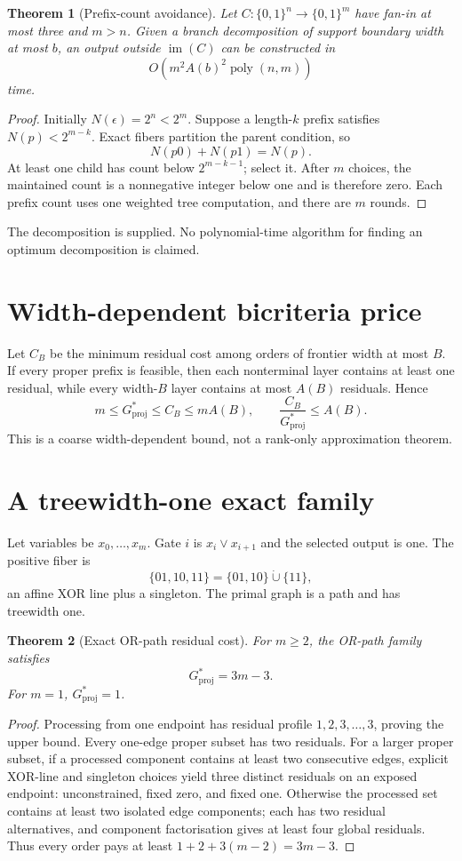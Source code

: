 \documentclass[11pt]{article}
\newtheorem{theorem}{Theorem}[section]
\newcommand{\Gproj}{G_{\mathrm{proj}}}
\begin{document}
\begin{theorem}[Prefix-count avoidance]
Let $C:\{0,1\}^n\to\{0,1\}^m$ have fan-in at most three and $m>n$. Given a branch decomposition of support boundary width at most $b$, an output outside $\operatorname{im}(C)$ can be constructed in
\[
O\!\left(m^2 A(b)^2\operatorname{poly}(n,m)\right)
\]
time.
\end{theorem}

\begin{proof}
Initially $N(\epsilon)=2^n<2^m$. Suppose a length-$k$ prefix satisfies $N(p)<2^{m-k}$. Exact fibers partition the parent condition, so
\[
N(p0)+N(p1)=N(p).
\]
At least one child has count below $2^{m-k-1}$; select it. After $m$ choices, the maintained count is a nonnegative integer below one and is therefore zero. Each prefix count uses one weighted tree computation, and there are $m$ rounds.
\end{proof}

The decomposition is supplied. No polynomial-time algorithm for finding an optimum decomposition is claimed.

\section{Width-dependent bicriteria price}
Let $C_B$ be the minimum residual cost among orders of frontier width at most $B$. If every proper prefix is feasible, then each nonterminal layer contains at least one residual, while every width-$B$ layer contains at most $A(B)$ residuals. Hence
\[
m\le \Gproj^*\le C_B\le mA(B),
\qquad
\frac{C_B}{\Gproj^*}\le A(B).
\]
This is a coarse width-dependent bound, not a rank-only approximation theorem.

\section{A treewidth-one exact family}
Let variables be $x_0,\ldots,x_m$. Gate $i$ is $x_i\lor x_{i+1}$ and the selected output is one. The positive fiber is
\[
\{01,10,11\}=\{01,10\}\mathbin{\dot\cup}\{11\},
\]
an affine XOR line plus a singleton. The primal graph is a path and has treewidth one.

\begin{theorem}[Exact OR-path residual cost]
For $m\ge2$, the OR-path family satisfies
\[
\Gproj^*=3m-3.
\]
For $m=1$, $\Gproj^*=1$.
\end{theorem}

\begin{proof}
Processing from one endpoint has residual profile $1,2,3,\ldots,3$, proving the upper bound. Every one-edge proper subset has two residuals. For a larger proper subset, if a processed component contains at least two consecutive edges, explicit XOR-line and singleton choices yield three distinct residuals on an exposed endpoint: unconstrained, fixed zero, and fixed one. Otherwise the processed set contains at least two isolated edge components; each has two residual alternatives, and component factorisation gives at least four global residuals. Thus every order pays at least $1+2+3(m-2)=3m-3$.
\end{proof}
\end{document}
